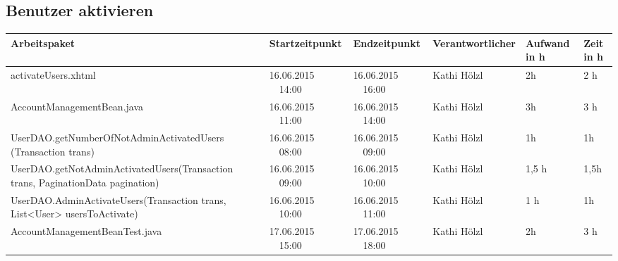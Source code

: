 \begin{landscape}
	\subsection{Benutzer aktivieren}
	\begin{tabular}{|p{10.3cm}|p{3.2cm}|p{3.2cm}|p{3.5cm}|p{1.7cm}|p{1.5cm}|}
		\hline  \textbf{Arbeitspaket} & \textbf{Startzeitpunkt} & \textbf{Endzeitpunkt} & \textbf{Verantwortlicher}  & \textbf{Aufwand in h} & \textbf{Zeit in h}\\ 
		\hline   activateUsers.xhtml                                 & 16.06.2015 \ \ 14:00     & 16.06.2015 \ \ 16:00               & Kathi Hölzl  &      2h     &     2 h    \\
		\hline   AccountManagementBean.java                          & 16.06.2015 \ \ 11:00     & 16.06.2015 \ \ 14:00            & Kathi Hölzl &      3h    &     3 h    \\
		\hline   UserDAO.getNumberOfNotAdminActivatedUsers (Transaction trans)    & 16.06.2015 \ \ 08:00     & 16.06.2015 \ \ 09:00            & Kathi Hölzl &      1h    &      1h    \\
		\hline   UserDAO.getNotAdminActivatedUsers(Transaction trans, PaginationData pagination)    & 16.06.2015 \ \ 09:00     & 16.06.2015 \ \ 10:00            & Kathi Hölzl &      1,5 h    &      1,5h    \\
		\hline   UserDAO.AdminActivateUsers(Transaction trans, List<User> usersToActivate)    & 16.06.2015 \ \ 10:00     & 16.06.2015 \ \ 11:00            & Kathi Hölzl &      1 h    &      1h    \\
		\hline   AccountManagementBeanTest.java                              & 17.06.2015 \ \ 15:00     & 17.06.2015 \ \ 18:00          & Kathi Hölzl  &      2h      &     3 h     \\
		\hline 
	\end{tabular} \ \\
	\ \\
	

\end{landscape}

